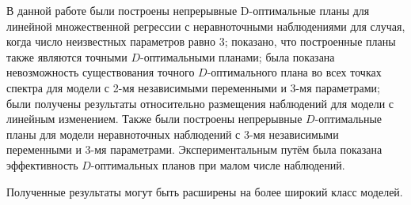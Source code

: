В данной работе были построены непрерывные D-оптимальные планы для линейной множественной регрессии с неравноточными наблюдениями для случая, когда число неизвестных параметров равно 3; показано, что построенные планы также являются точными $D$-оптимальными планами; была показана невозможность существования точного $D$-оптимального плана во всех точках спектра для модели с 2-мя независимыми переменными и 3-мя параметрами; были получены результаты относительно размещения наблюдений для модели с линейным изменением. Также были построены непрерывные $D$-оптимальные планы для модели неравноточных наблюдений с 3-мя независимыми переменными и 3-мя параметрами. Экспериментальным путём была показана эффективность $D$-оптимальных планов при малом числе наблюдений.

Полученные результаты могут быть расширены на более широкий класс моделей.